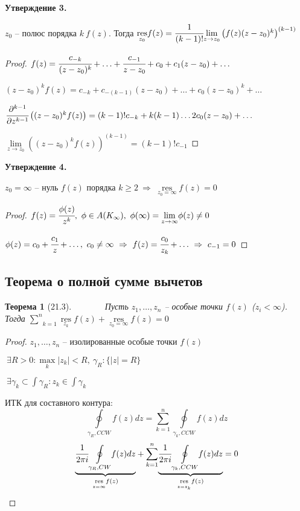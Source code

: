 \documentclass[draft]{article}
\newcommand{\res}{\mathop{\mathrm{res}}\nolimits}
\renewcommand{\bf}{\bfseries}
\newcommand{\forcenewline}{$\phantom{\mbox{newline}}$\newline}
\newcommand{\dd}{\partial}
\newcommand{\then}{\ \Rightarrow\ }
\newcommand{\moint}[1]{\underset{#1}{\oint}}
\newcommand{\msum}[2]{\underset{#1}{\overset{#2}{\sum}}}
\newcommand{\mlim}[1]{\underset{#1}{\lim}}
\newcommand{\mres}[1]{\underset{#1}{\res}}
\newcommand{\g}{\gamma}
\renewcommand{\f}{\phi}
\newcommand{\E}{\ \exists}
\newtheorem*{theor}{Теорема}
\theoremstyle{remark}
\begin{document}
{\bf Утверждение 3.}

$z_0$ -- полюс порядка $k\ f(z)$. Тогда $\mres{z_0}f(z)=\cfrac{1}{(k-1)!}\mlim{z\to z_0}\left(f(z)(z-z_0)^k\right)^{(k-1)}$

\begin{proof}
$f(z)=\cfrac{c_{-k}}{(z-z_0)^k}+\ldots+\cfrac{c_{-1}}{z-z_0}+c_0+c_1(z-z_0)+\ldots$

$(z-z_0)^kf(z)=c_{-k}+c_{-(k-1)}(z-z_0)+\ldots+c_0(z-z_0)^k+\ldots$

$\cfrac{\dd^{k-1}}{\dd z^{k-1}}\left((z-z_0)^kf(z)\right)=(k-1)!c_{-k}+k(k-1)\ldots2c_0(z-z_0)+\ldots$

$\mlim{z\to z_0}\left((z-z_0)^kf(z)\right)^{(k-1)}=(k-1)!c_{-1}$
\end{proof}

{\bf Утверждение 4.}

$z_0=\infty$ -- нуль $f(z)$ порядка $k\geq2\then\mres{z_0=\infty}f(z)=0$
\begin{proof}
$f(z)=\cfrac{\f(z)}{z^k},\ \f\in A(K_\infty),\ \f(\infty)=\mlim{z\to\infty}\f(z)\neq0$

$\f(z)=c_0+\cfrac{c_1}z+\ldots,\ c_0\neq\infty\then f(z)=\cfrac{c_0}{z_k}+\ldots\then c_{-1}=0$
\end{proof}

\subsection{Теорема о полной сумме вычетов}

\begin{theor}[21.3]
\forcenewline
Пусть $z_1,\ldots,z_n$ -- особые точки $f(z)$ ($z_i<\infty$). Тогда $\msum{k=1}{n}\mres{z_k}f(z)+\mres{z_0=\infty}f(z)=0$
\end{theor}

\begin{proof}
$z_1,\ldots,z_n$ -- изолированные особые точки $f(z)$

$\E R>0\colon\underset{k}{\max}|z_k|<R,\ \g_R\colon\{|z|=R\}$

$\E\g_k\subset\int\g_R\colon z_k\in\int\g_k$

ИТК для составного контура:
$$
\moint{\g_R,CCW}f(z)dz=\msum{k=1}{n}\moint{\g_k,CCW}f(z)dz
$$
$$
\underset{\mres{z=\infty}f(z)}{\underbrace{\cfrac{1}{2\pi i}\moint{\g_R,CW}f(z)dz}}+\msum{k=1}{n}\underset{\mres{z=z_k}f(z)}{\underbrace{\cfrac{1}{2\pi i}\moint{\g_k,CCW}f(z)dz}}=0
$$
\end{proof}

\newpage
\end{document}
